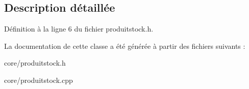 \subsection{Description détaillée}


Définition à la ligne 6 du fichier produitstock.h.



La documentation de cette classe a été générée à partir des fichiers suivants :\begin{DoxyCompactItemize}
\item 
core/produitstock.h\item 
core/produitstock.cpp\end{DoxyCompactItemize}
